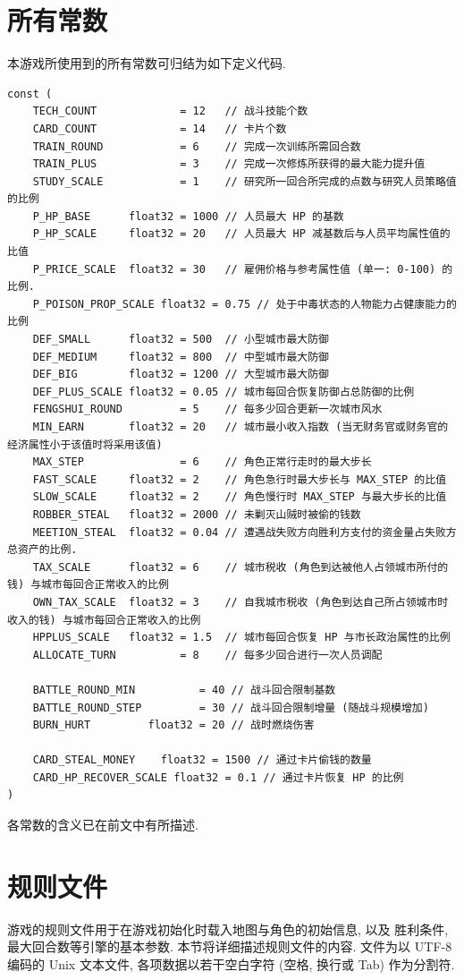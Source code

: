 \documentclass[UTF8, zihao=-4]{ctexart} %
\begin{document}
\section{所有常数}
\label{s_const}
本游戏所使用到的所有常数可归结为如下定义代码.
\begin{lstlisting}
const (
    TECH_COUNT             = 12   // 战斗技能个数
    CARD_COUNT             = 14   // 卡片个数
    TRAIN_ROUND            = 6    // 完成一次训练所需回合数
    TRAIN_PLUS             = 3    // 完成一次修炼所获得的最大能力提升值
    STUDY_SCALE            = 1    // 研究所一回合所完成的点数与研究人员策略值的比例
    P_HP_BASE      float32 = 1000 // 人员最大 HP 的基数
    P_HP_SCALE     float32 = 20   // 人员最大 HP 减基数后与人员平均属性值的比值
    P_PRICE_SCALE  float32 = 30   // 雇佣价格与参考属性值 (单一: 0-100) 的比例.
    P_POISON_PROP_SCALE float32 = 0.75 // 处于中毒状态的人物能力占健康能力的比例
    DEF_SMALL	   float32 = 500  // 小型城市最大防御
    DEF_MEDIUM     float32 = 800  // 中型城市最大防御
    DEF_BIG  	   float32 = 1200 // 大型城市最大防御
    DEF_PLUS_SCALE float32 = 0.05 // 城市每回合恢复防御占总防御的比例
    FENGSHUI_ROUND         = 5    // 每多少回合更新一次城市风水
    MIN_EARN       float32 = 20   // 城市最小收入指数 (当无财务官或财务官的经济属性小于该值时将采用该值)
    MAX_STEP               = 6    // 角色正常行走时的最大步长
    FAST_SCALE     float32 = 2    // 角色急行时最大步长与 MAX_STEP 的比值
    SLOW_SCALE     float32 = 2    // 角色慢行时 MAX_STEP 与最大步长的比值
    ROBBER_STEAL   float32 = 2000 // 未剿灭山贼时被偷的钱数
    MEETION_STEAL  float32 = 0.04 // 遭遇战失败方向胜利方支付的资金量占失败方总资产的比例.
    TAX_SCALE      float32 = 6    // 城市税收 (角色到达被他人占领城市所付的钱) 与城市每回合正常收入的比例
    OWN_TAX_SCALE  float32 = 3    // 自我城市税收 (角色到达自己所占领城市时收入的钱) 与城市每回合正常收入的比例
    HPPLUS_SCALE   float32 = 1.5  // 城市每回合恢复 HP 与市长政治属性的比例
    ALLOCATE_TURN          = 8    // 每多少回合进行一次人员调配

    BATTLE_ROUND_MIN          = 40 // 战斗回合限制基数
    BATTLE_ROUND_STEP         = 30 // 战斗回合限制增量 (随战斗规模增加)
    BURN_HURT         float32 = 20 // 战时燃烧伤害

    CARD_STEAL_MONEY    float32 = 1500 // 通过卡片偷钱的数量
    CARD_HP_RECOVER_SCALE float32 = 0.1 // 通过卡片恢复 HP 的比例
)
\end{lstlisting}
各常数的含义已在前文中有所描述.

\section{规则文件}
\label{s_mfile}
游戏的规则文件用于在游戏初始化时载入地图与角色的初始信息, 以及
胜利条件, 最大回合数等引擎的基本参数. 本节将详细描述规则文件的内容. 
文件为以 UTF-8 编码的 Unix 文本文件, 各项数据以若干空白字符 (空格, 换行或 Tab)
作为分割符.
\end{document}
